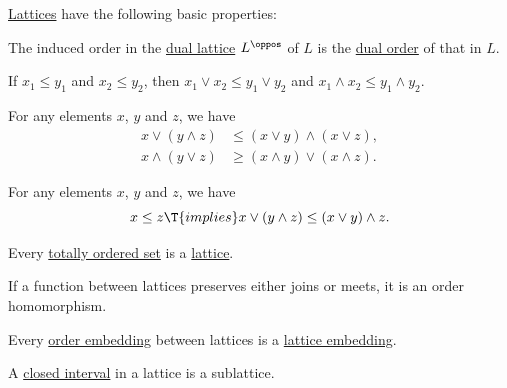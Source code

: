 \begin{proposition}\label{thm:def:lattice}
  \hyperref[def:lattice]{Lattices} have the following basic properties:
  \begin{thmenum}
     The induced order in the \hyperref[def:lattice/opposite]{dual lattice} \( L^\oppos \) of \( L \) is the \hyperref[def:partially_ordered_set/opposite]{dual order} of that in \( L \).

     If \( x_1 \leq y_1 \) and \( x_2 \leq y_2 \), then \( x_1 \vee x_2 \leq y_1 \vee y_2 \) and \( x_1 \wedge x_2 \leq y_1 \wedge y_2 \).

     For any elements \( x \), \( y \) and \( z \), we have
    \begin{align}
      x \vee (y \wedge z) &\leq (x \vee y) \wedge (x \vee z), \label{eq:thm:def:lattice/distributive_inequality/join_over_meet} \\
      x \wedge (y \vee z) &\geq (x \wedge y) \vee (x \wedge z). \label{eq:thm:def:lattice/distributive_inequality/meet_over_join}
    \end{align}

     For any elements \( x \), \( y \) and \( z \), we have
    \begin{equation}\label{eq:thm:def:lattice/modular_inequality}
      x \leq z \T{implies} x \vee (y \wedge z) \leq (x \vee y) \wedge z.
    \end{equation}

     Every \hyperref[def:totally_ordered_set]{totally ordered set} is a \hyperref[def:lattice]{lattice}.

     If a function between lattices preserves either joins or meets, it is an order homomorphism.

     Every \hyperref[def:partially_ordered_set/morphism]{order embedding} between lattices is a \hyperref[def:lattice/morphism]{lattice embedding}.

     A \hyperref[def:order_interval/closed]{closed interval} in a lattice is a sublattice.
  \end{thmenum}
\end{proposition}
